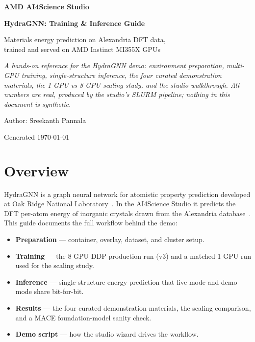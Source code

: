 \documentclass[11pt]{article}
\begin{document}
\begin{titlepage}
\centering
\vspace*{2.5cm}
{\Huge\bfseries\color{amdred} AMD AI4Science Studio\par}
\vspace{0.6cm}
{\LARGE\bfseries HydraGNN: Training \& Inference Guide\par}
\vspace{0.4cm}
{\large Materials energy prediction on Alexandria DFT data,\\ trained and served on AMD Instinct\texttrademark{} MI355X GPUs\par}
\vspace{2cm}
\begin{minipage}{0.85\textwidth}
\centering\itshape
A hands-on reference for the HydraGNN demo: environment preparation, multi-GPU
training, single-structure inference, the four curated demonstration materials,
the 1-GPU vs 8-GPU scaling study, and the studio walkthrough. All numbers are
real, produced by the studio's SLURM pipeline; nothing in this document is
synthetic.
\end{minipage}
\vfill
{\large Author: Sreekanth Pannala\par}
\vspace{0.3cm}
{\small Generated \today\par}
\end{titlepage}

\tableofcontents
\newpage

\section{Overview}

HydraGNN is a graph neural network for atomistic property prediction developed at
Oak Ridge National Laboratory~\cite{hydragnn,lupomercado2022}. In the AI4Science
Studio it predicts the DFT per-atom energy of inorganic crystals drawn from the
Alexandria database~\cite{alexandria,schmidt2023}. This guide documents the full
workflow behind the demo:

\begin{itemize}[nosep]
  \item \textbf{Preparation} --- container, overlay, dataset, and cluster setup.
  \item \textbf{Training} --- the 8-GPU DDP production run (v3) and a matched
        1-GPU run used for the scaling study.
  \item \textbf{Inference} --- single-structure energy prediction that live mode
        and demo mode share bit-for-bit.
  \item \textbf{Results} --- the four curated demonstration materials, the
        scaling comparison, and a MACE foundation-model sanity check.
  \item \textbf{Demo script} --- how the studio wizard drives the workflow.
\end{itemize}
\end{document}

